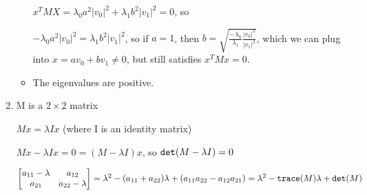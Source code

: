 \documentclass{article}
\begin{document}
\begin{enumerate}
\begin{itemize}
\begin{center}
		$x^TMX=\lambda_0a^2|v_0|^2+\lambda_1b^2|v_1|^2 = 0$, so
		
		$-\lambda_0a^2|v_0|^2=\lambda_1b^2|v_1|^2$, so if $a=1$, then $b=\sqrt{\frac{-\lambda_0}{\lambda_1} \frac{|v_0|^2}{|v_1|^2} }$, which we can plug into $x=av_0+bv_1\neq0$, but still satisfies $x^TMx=0$.
	\end{center}
	
	\item The eigenvalues are positive.
\end{itemize}

\item M is a $2\times 2 $ matrix
\begin{center}
$Mx=\lambda Ix$ (where I is an identity matrix)

$Mx-\lambda Ix = 0 = (M-\lambda I)x$, so $\verb+det+(M-\lambda I)=0$

$\begin{bmatrix} a_{11}-\lambda & a_{12} \\ a_{21} & a_{22}-\lambda \end{bmatrix}  = \lambda^2 - (a_{11}+a_{22})\lambda+(a_{11}a_{22}-a_{12}a_{21})= \lambda^2-\verb+trace+(M)\lambda+\verb+det+(M)$
\end{center}


\end{enumerate}
\end{document}

